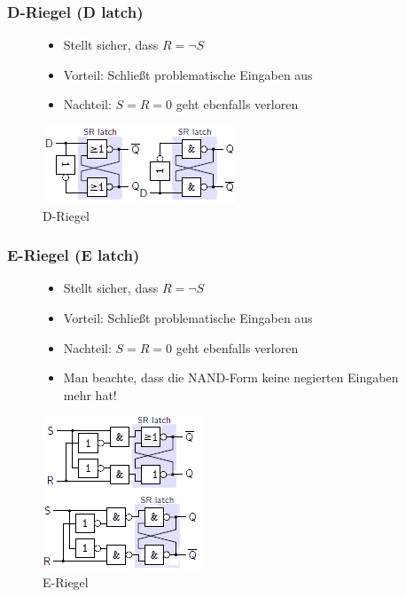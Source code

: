 \documentclass[12pt]{report}
\begin{document}
\subsubsection{D-Riegel (D latch)}
\begin{figure}[H]
  \begin{minipage}[t]{0.45\textwidth}
    \begin{itemize}
      \item Stellt sicher, dass $R = \neg S$
      \item Vorteil: Schließt problematische Eingaben aus
      \item Nachteil: $S=R=0$ geht ebenfalls verloren
    \end{itemize}
  \end{minipage}
  \hfill
  \begin{minipage}[t]{0.45\textwidth}
    \caption{D-Riegel}
    \centering
    \includegraphics{riegel_d-riegel}
  \end{minipage}
\end{figure}


\subsubsection{E-Riegel (E latch)}
\begin{figure}[H]
  \begin{minipage}[t]{0.45\textwidth}
    \begin{itemize}
      \item Stellt sicher, dass $R = \neg S$
      \item Vorteil: Schließt problematische Eingaben aus
      \item Nachteil: $S=R=0$ geht ebenfalls verloren
      \item Man beachte, dass die NAND-Form keine negierten Eingaben mehr hat!
    \end{itemize}
  \end{minipage}
  \hfill
  \begin{minipage}[t]{0.45\textwidth}
    \caption{E-Riegel}
    \centering
    \includegraphics{riegel_e-riegel}
  \end{minipage}
\end{figure}
\end{document}
